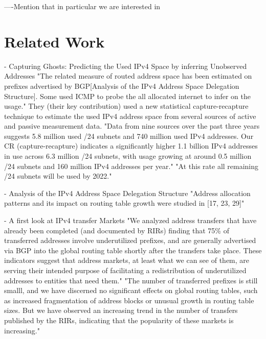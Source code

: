\documentclass[11pt,a4paper]{scrreprt}
\begin{document}
----Mention that in particular we are interested in

\chapter{Related Work}
- Capturing Ghosts: Predicting the Used IPv4 Space by inferring Unobserved Addresses
"The related measure of routed address space has been estimated on prefixes advertised by BGP[Analysis of the IPv4 Address Space Delegation Structure]. Some used ICMP to probe the all allocated internet to infer on the usage." They (their key contribution) used a new statistical capture-recapture technique to estimate the used IPv4 address space from several sources of active and passive measurement data. "Data from nine sources over the past three years suggests 5.8 million used /24 subnets and 740 million used IPv4 addresses. Our CR (capture-recapture) indicates a significantly higher 1.1 billion IPv4 addresses in use across 6.3 million /24 subnets, with usage growing at around 0.5 million /24 subnets and 160 million IPv4 addresses per year." "At this rate all remaining /24 subnets will be used by 2022."

- Analysis of the IPv4 Address Space Delegation Structure
 "Address allocation patterns and its impact on routing table growth were
studied in [17, 23, 29]" 


- A first look at IPv4 transfer Markets
"We analyzed address transfers that have already been completed (and documented by RIRs) finding that 75\% of transferred addresses involve underutilized prefixes, and are generally advertised via BGP into the global routing table shortly after the transfers take place. These indicators suggest that address markets, at least what we can see of them, are serving their intended purpose of facilitating a redistribution of underutilized addresses to entities that need them." "The number of transferred prefixes is still smalll, and we have discerned no significant effects on global routing tables, such as increased fragmentation of address blocks or unusual growth in routing table sizes. But we have observed an increasing trend in the number of transfers published by the RIRs, indicating that the popularity of these markets is increasing."
\end{document}
